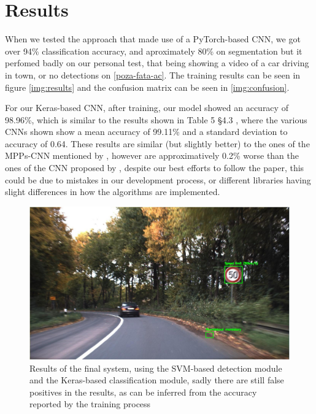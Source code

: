 \documentclass[conference]{IEEEtran}
\begin{document}
\section{Results}

When we tested the approach that made use of a PyTorch-based CNN, we got over 94\% classification accuracy, and aproximately 80\%
on segmentation but it perfomed badly on our personal test, that being showing a video of
a car driving in town, or no detections on \ref{poza-fata-ac}. The training results can be seen in figure \ref{img:results} and
the confusion matrix can be seen in \ref{img:confusion}.

For our Keras-based CNN, after training, our model showed an accuracy of 98.96\%, which is similar to the results shown in
Table 5 \S 4.3 \cite{svm_paper}, where the various CNNs shown show a mean accuracy of 99.11\% and a standard deviation to accuracy
of 0.64. These results are similar (but slightly better) to the ones of the MPPs-CNN mentioned by \cite{7603237}, however are approximatively 0.2\% worse
than the ones of the CNN proposed by \cite{svm_paper}, despite our best efforts to follow the paper, this could be due to mistakes
in our development process, or different libraries having slight differences in how the algorithms are implemented.

\begin{figure}
    \includegraphics[width=\linewidth]{keras-detection}
    \centering
    \caption{Results of the final system, using the SVM-based detection module and the Keras-based classification module,
    sadly there are still false positives in the results, as can be inferred from the accuracy reported by the training process}
\end{figure}
\end{document}

